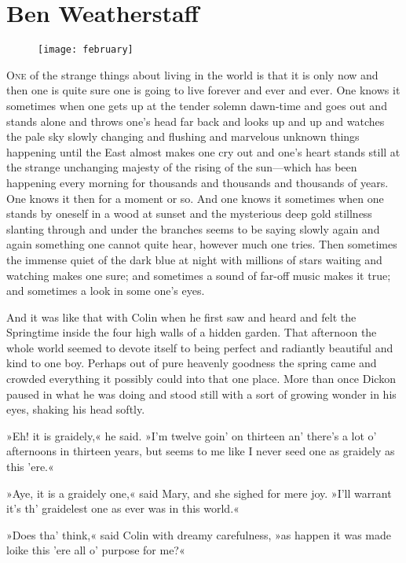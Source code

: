 \chapter{Ben Weatherstaff} 
	
\begin{figure}[t!]
\centering
\texttt{[image: february]}
\end{figure}

	\lettrine[lines=6]{O}{ne} of the strange things about living in the world is that it is only now and then one is quite sure one is going to live forever and ever and ever. One knows it sometimes when one gets up at the tender solemn dawn-time and goes out and stands alone and throws one's head far back and looks up and up and watches the pale sky slowly changing and flushing and marvelous unknown things happening until the East almost makes one cry out and one's heart stands still at the strange unchanging majesty of the rising of the sun—which has been happening every morning for thousands and thousands and thousands of years. One knows it then for a moment or so. And one knows it sometimes when one stands by oneself in a wood at sunset and the mysterious deep gold stillness slanting through and under the branches seems to be saying slowly again and again something one cannot quite hear, however much one tries. Then sometimes the immense quiet of the dark blue at night with millions of stars waiting and watching makes one sure; and sometimes a sound of far-off music makes it true; and sometimes a look in some one's eyes.

And it was like that with Colin when he first saw and heard and felt the Springtime inside the four high walls of a hidden garden. That afternoon the whole world seemed to devote itself to being perfect and radiantly beautiful and kind to one boy. Perhaps out of pure heavenly goodness the spring came and crowded everything it possibly could into that one place. More than once Dickon paused in what he was doing and stood still with a sort of growing wonder in his eyes, shaking his head softly.

»Eh! it is graidely,« he said. »I'm twelve goin' on thirteen an' there's a lot o' afternoons in thirteen years, but seems to me like I never seed one as graidely as this 'ere.«

»Aye, it is a graidely one,« said Mary, and she sighed for mere joy. »I'll warrant it's th' graidelest one as ever was in this world.«

»Does tha' think,« said Colin with dreamy carefulness, »as happen it was made loike this 'ere all o' purpose for me?«

